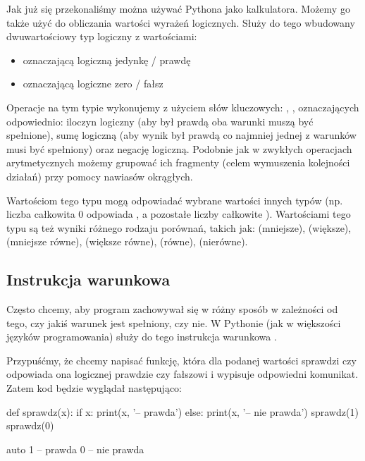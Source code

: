 Jak już się przekonaliśmy można używać Pythona jako kalkulatora. Możemy go także użyć do obliczania wartości wyrażeń logicznych. Służy do tego wbudowany dwuwartościowy typ logiczny z wartościami:
\begin{itemize}
\item {} oznaczającą logiczną jedynkę / prawdę
\item {} oznaczającą logiczne zero / fałsz
\end{itemize}
Operacje na tym typie wykonujemy z użyciem słów kluczowych: , ,  oznaczających odpowiednio:
iloczyn logiczny (aby był prawdą oba warunki muszą być spełnione), sumę logiczną (aby wynik był prawdą co najmniej jednej z warunków musi być spełniony) oraz negację logiczną.
Podobnie jak w zwykłych operacjach arytmetycznych możemy grupować ich fragmenty (celem wymuszenia kolejności działań) przy pomocy nawiasów okrągłych.

Wartościom tego typu mogą odpowiadać wybrane wartości innych typów (np. liczba całkowita 0 odpowiada , a pozostałe liczby całkowite ).
Wartościami tego typu są też wyniki różnego rodzaju porównań, takich jak: \python{<} (mniejsze), \python{>} (większe), \python{<=} (mniejsze równe),
\python{>=} (większe równe), \python{==} (równe), \python{!=} (nierówne).

\subsection{Instrukcja warunkowa }

Często chcemy, aby program zachowywał się w różny sposób w zależności od tego, czy jakiś warunek jest spełniony, czy nie.
W Pythonie (jak w większości języków programowania) służy do tego instrukcja warunkowa .

Przypuśćmy, że chcemy napisać funkcję, która dla podanej wartości sprawdzi czy odpowiada ona logicznej prawdzie czy fałszowi i wypisuje odpowiedni komunikat.
Zatem kod będzie wyglądał następująco:

\begin{CodeFrame}[python]{0.50\textwidth}
def sprawdz(x):
    if x:
        print(x, '-- prawda')
    else:
        print(x, '-- nie prawda')
sprawdz(1)
sprawdz(0)
\end{CodeFrame}
\begin{CodeFrame}{auto}
1 -- prawda
0 -- nie prawda
\end{CodeFrame}

